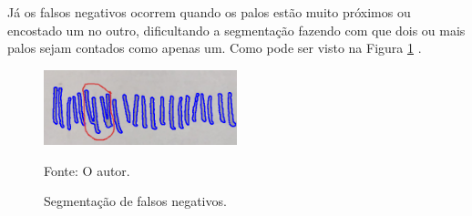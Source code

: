 Já os falsos negativos ocorrem quando os palos estão muito próximos ou encostado um no outro, dificultando a segmentação fazendo com que dois ou mais palos sejam contados como apenas um. Como pode ser visto na Figura \ref{fig:palo-seg}  .

\begin{figure}[H]
 \centering
 \includegraphics[width=0.50\textwidth]{./fig/resultado-analise/seg-palos}
 \caption{Segmentação de falsos negativos.}
  Fonte: O autor.
 \label{fig:palo-seg}
\end{figure}


